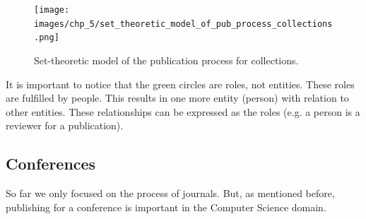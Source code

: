 \documentclass{ou-report}
\begin{document}
            
            

\begin{figure}[H]
\centering
\texttt{[image: images/chp\_5/set\_theoretic\_model\_of\_pub\_process\_collections.png]}
\caption{Set-theoretic model of the publication process for collections.}
\label{fig:structure_journal}
\end{figure}

It is important to notice that the green circles are roles, not entities. These 
roles are fulfilled by people. This results in one more entity (person) with 
relation to other entities. These relationships can be expressed as the roles 
(e.g. a person is a reviewer for a publication).

\subsection{Conferences}
So far we only focused on the process of journals. But, as mentioned before, 
publishing for a conference is important in the Computer Science domain.
\end{document}
